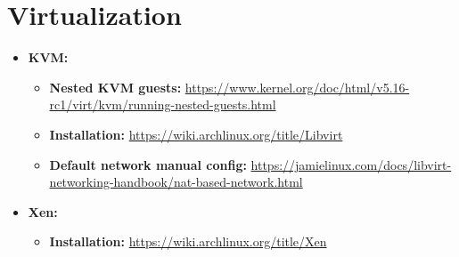 \documentclass[10pt, a4paper, onecolumn, oneside, titlepage, openany]{book}
\begin{document}
\section{Virtualization}
\begin{itemize}
    \item \textbf{KVM:}
    \begin{itemize}
        \item \textbf{Nested KVM guests:} \url{https://www.kernel.org/doc/html/v5.16-rc1/virt/kvm/running-nested-guests.html}
        \item \textbf{Installation:} \url{https://wiki.archlinux.org/title/Libvirt}
        \item \textbf{Default network manual config:} \url{https://jamielinux.com/docs/libvirt-networking-handbook/nat-based-network.html}
    \end{itemize}
    \item \textbf{Xen:}
    \begin{itemize}
        \item \textbf{Installation:} \url{https://wiki.archlinux.org/title/Xen}
    \end{itemize}
\end{itemize}
\end{document}
